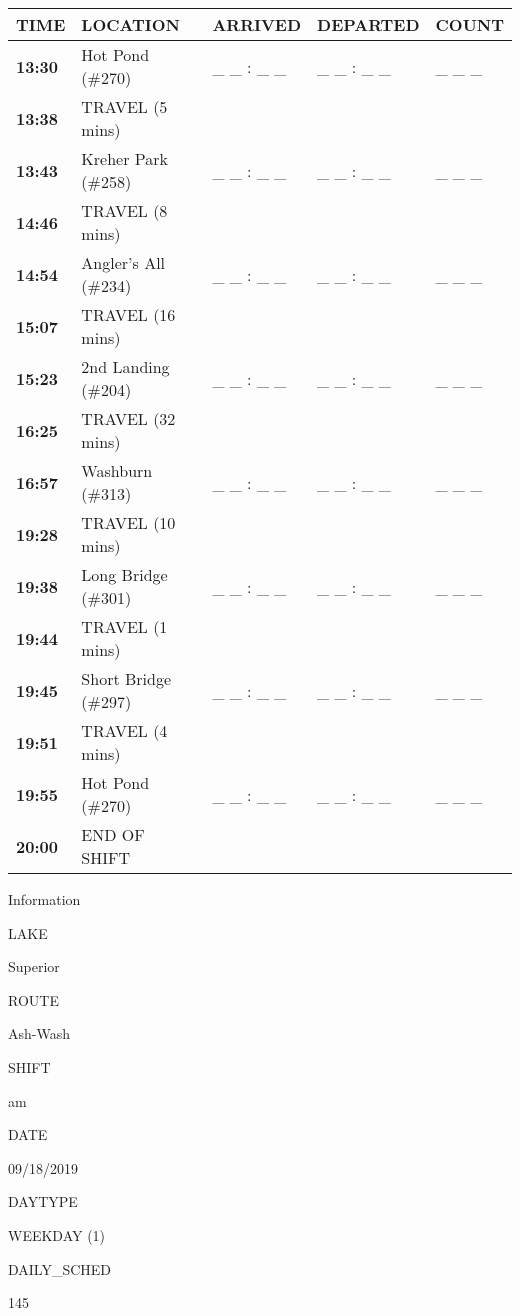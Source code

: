 \documentclass[]{article}
\begin{document}
\begin{tabular}{>{\bfseries}lllll}
\toprule
\textbf{TIME} & \textbf{LOCATION} & \textbf{ARRIVED} & \textbf{DEPARTED} & \textbf{COUNT}\\
\midrule
13:30 & Hot Pond (\#270) & \_ \_ : \_ \_ & \_ \_ : \_ \_ & \_ \_ \_\\
13:38 & TRAVEL (5 mins) &  &  & \\
13:43 & Kreher Park (\#258) & \_ \_ : \_ \_ & \_ \_ : \_ \_ & \_ \_ \_\\
14:46 & TRAVEL (8 mins) &  &  & \\
14:54 & Angler's All (\#234) & \_ \_ : \_ \_ & \_ \_ : \_ \_ & \_ \_ \_\\
15:07 & TRAVEL (16 mins) &  &  & \\
15:23 & 2nd Landing (\#204) & \_ \_ : \_ \_ & \_ \_ : \_ \_ & \_ \_ \_\\
16:25 & TRAVEL (32 mins) &  &  & \\
16:57 & Washburn (\#313) & \_ \_ : \_ \_ & \_ \_ : \_ \_ & \_ \_ \_\\
19:28 & TRAVEL (10 mins) &  &  & \\
19:38 & Long Bridge (\#301) & \_ \_ : \_ \_ & \_ \_ : \_ \_ & \_ \_ \_\\
19:44 & TRAVEL (1 mins) &  &  & \\
19:45 & Short Bridge (\#297) & \_ \_ : \_ \_ & \_ \_ : \_ \_ & \_ \_ \_\\
19:51 & TRAVEL (4 mins) &  &  & \\
19:55 & Hot Pond (\#270) & \_ \_ : \_ \_ & \_ \_ : \_ \_ & \_ \_ \_\\
20:00 & END OF SHIFT &  &  & \\
\bottomrule
\end{tabular}\newpage

Information

LAKE

Superior

ROUTE

Ash-Wash

SHIFT

am

DATE

09/18/2019

DAYTYPE

WEEKDAY (1)

DAILY\_SCHED

145

\vspace{24pt}
\end{document}
